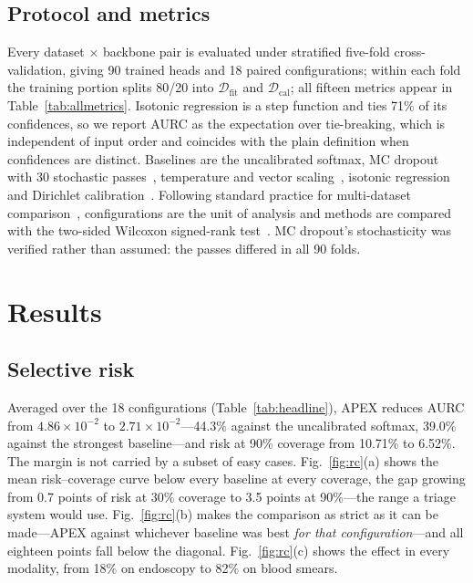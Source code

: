 \documentclass[conference]{IEEEtran}
\begin{document}
\subsection{Protocol and metrics}
Every dataset $\times$ backbone pair is evaluated under stratified five-fold
cross-validation, giving 90 trained heads and 18 paired configurations; within each
fold the training portion splits 80/20 into $\mathcal{D}_{\mathrm{fit}}$ and
$\mathcal{D}_{\mathrm{cal}}$; all fifteen metrics appear in
Table~\ref{tab:allmetrics}. Isotonic regression is a step function and ties 71\%
of its confidences, so we report AURC as the expectation over tie-breaking, which
is independent of input order and coincides with the plain definition when
confidences are distinct. Baselines are the uncalibrated softmax, MC dropout
with 30 stochastic passes~\cite{gal2016dropout}, temperature and vector
scaling~\cite{guo2017calibration}, isotonic
regression~\cite{zadrozny2002transforming} and Dirichlet
calibration~\cite{kull2019beyond}. Following standard practice for multi-dataset
comparison~\cite{demsar2006statistical}, configurations are the unit of analysis
and methods are compared with the two-sided Wilcoxon signed-rank
test~\cite{wilcoxon1945individual}. MC dropout's stochasticity was verified rather
than assumed: the passes differed in all 90 folds.



\section{Results}

\subsection{Selective risk}
Averaged over the 18 configurations (Table~\ref{tab:headline}), APEX reduces AURC
from $4.86\times10^{-2}$ to $2.71\times10^{-2}$---44.3\% against the uncalibrated
softmax, 39.0\% against the strongest baseline---and risk at 90\% coverage from
10.71\% to 6.52\%. The margin is not carried by a subset of easy cases.
Fig.~\ref{fig:rc}(a) shows the mean risk--coverage curve below every baseline at
every coverage, the gap growing from 0.7 points of risk at 30\% coverage to 3.5
points at 90\%---the range a triage system would use.
Fig.~\ref{fig:rc}(b) makes the comparison as strict as it can be made---APEX
against whichever baseline was best \emph{for that configuration}---and all
eighteen points fall below the diagonal. Fig.~\ref{fig:rc}(c) shows the effect in
every modality, from 18\% on endoscopy to 82\% on blood smears.
\end{document}

